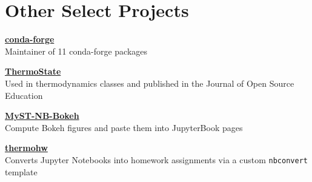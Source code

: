 \section{Other Select Projects}
\begin{minipage}[t]{0.23\textwidth}
\textbf{\href{https://github.com/orgs/conda-forge/teams?query=\%40bryanwweber}{conda-forge}}\\
Maintainer of 11 conda-forge packages
\end{minipage}
\hfill\vline\hfill
\begin{minipage}[t]{0.23\textwidth}
\textbf{\href{https://github.com/bryanwweber/thermostate}{ThermoState}}\\
Used in thermodynamics classes and published in the Journal of Open Source Education
\end{minipage}
\hfill\vline\hfill
\begin{minipage}[t]{0.23\textwidth}
\textbf{\href{https://github.com/bryanwweber/MyST-NB-Bokeh}{MyST-NB-Bokeh}}\\
Compute Bokeh figures and paste them into JupyterBook pages
\end{minipage}
\hfill\vline\hfill
\begin{minipage}[t]{0.23\textwidth}
\textbf{\href{https://github.com/bryanwweber/thermohw}{thermohw}}\\
Converts Jupyter Notebooks into homework assignments via a custom \verb|nbconvert| template
\end{minipage}
